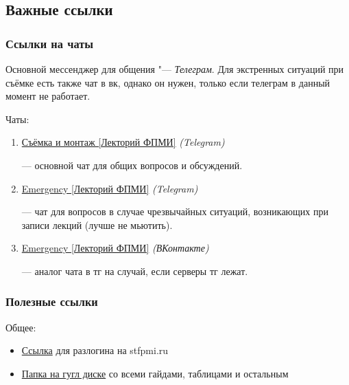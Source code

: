 \subsection{Важные ссылки}\label{ssec:important-links}

\subsubsection{Ссылки на чаты}\label{subsec:chat-references}
Основной мессенджер для общения "--- \textit{Телеграм}. Для экстренных ситуаций при съёмке есть также чат в вк, однако он нужен, только если телеграм в данный момент не работает.

Чаты:
\begin{enumerate}
  \item \hypertarget{main-chat-tg}{\href{https://t.me/+sZ_hqEHTYIg1NjYy}{Съёмка и монтаж [Лекторий ФПМИ]} \textit{(Telegram)}} --- основной чат для общих вопросов и обсуждений.

  \item \hypertarget{emergency-chat-tg}{\href{https://t.me/+WyQqZQYl2w8wYjAy}{Emergency [Лекторий ФПМИ]} \textit{(Telegram)}} --- чат для вопросов в случае чрезвычайных ситуаций, возникающих при записи лекций (лучше не мьютить).

  \item \hypertarget{emergency-chat-vk}{\href{https://vk.me/join/AJQ1d0vm9RxLwVfF_3bKMprQ}{Emergency [Лекторий ФПМИ]} \textit{(ВКонтакте)}} --- аналог чата в тг на случай, если серверы тг лежат.

\end{enumerate}

\subsubsection{Полезные ссылки}

Общее:
\begin{itemize}[topsep=1.5\parskip, itemsep=0.5\parskip]
  \item \href{https://infra.stfpmi.ru/auth/realms/stfpmi/account/#/}{Ссылка} для разлогина на stfpmi.ru
  \item \href{https://drive.google.com/drive/folders/1OkJQEHMSALAlE_e2tF5Y0Ol1dYFrt_BD}{Папка на гугл диске} со всеми гайдами, таблицами и остальным
\end{itemize}

